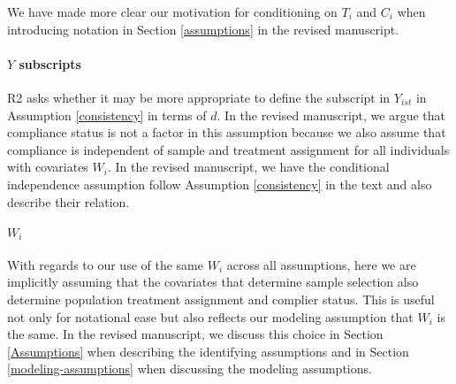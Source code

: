 \documentclass[hidelinks,12pt,letterpaper]{article}
\begin{document}
We have made more clear our motivation for conditioning on  $T_i$ and $C_i$ when introducing notation in Section \ref{assumptions} in the revised manuscript. 

\paragraph{$Y$ subscripts}

R2 asks whether it may be more appropriate to define the subscript in $Y_{ist}$ in Assumption \ref{consistency} in terms of $d$. In the revised manuscript, we argue that compliance status is not a factor in this assumption because we also assume that compliance is independent of sample and treatment assignment for all individuals with covariates $W_i$. In the revised manuscript, we have the conditional independence assumption follow Assumption \ref{consistency} in the text and also describe their relation. 

\paragraph{$W_i$} \label{Wi}

With regards to our use of the same $W_i$ across all assumptions, here we are implicitly assuming that the covariates that determine sample selection also determine population treatment assignment and complier status. This is useful not only for notational ease but also reflects our modeling assumption that $W_i$ is the same. In the revised manuscript, we discuss this choice in Section \ref{Assumptions} when describing the identifying assumptions and in Section \ref{modeling-assumptions} when discussing the modeling assumptions. 
\end{document}
